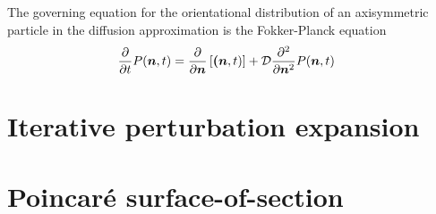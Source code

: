 \documentclass[thesis.tex]{subfiles}
\begin{document}
The governing equation for the orientational distribution of an axisymmetric particle in the diffusion approximation is the Fokker-Planck equation
\begin{align*}
	\frac{\partial}{\partial t}P(\mbox{\boldmath$n$}, t) &= \frac{\partial}{\partial \mbox{\boldmath$n$}}\left[\mbox{\boldmath$($}\mbox{\boldmath$n$}, t)\right] + \mathcal D \frac{\partial^2}{\partial \mbox{\boldmath$n$}^2}P(\mbox{\boldmath$n$}, t)
\end{align*}

\section{Iterative perturbation expansion}

\section{Poincar\'e surface-of-section}
\end{document}
